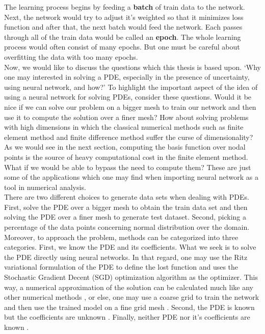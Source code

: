 The learning process begins by feeding a \textbf{batch} of train data to the network. Next, the network would try to adjust it's weighted so that it minimizes loss function and after that, the next batch would feed the network. Each passes through all of the train data would be called an \textbf{epoch}. The whole learning process would often consist of many epochs. But one must be careful about overfitting the data with too many epochs.\\
Now, we would like to discuss the questions which this thesis is based upon. `Why one may interested in solving a PDE, especially in the presence of uncertainty, using neural network, and how?' To highlight the important aspect of the idea of using a neural network for solving PDEs, consider these questions. Would it be nice if we can solve our problem on a bigger mesh to train our network and then use it to compute the solution over a finer mesh? How about solving problems with high dimensions in which the classical numerical methods such as finite element method and finite difference method suffer the curse of dimensionality? As we would see in the next section, computing the basis function over nodal points is the source of heavy computational cost in the finite element method. What if we would be able to bypass the need to compute them? These are just some of the applications which one may find when importing neural network as a tool in numerical analysis.\\
There are two different choices to generate data sets when dealing with PDEs. First, solve the PDE over a bigger mesh to obtain the train data set and then solving the PDE over a finer mesh to generate test dataset. Second, picking a percentage of the data points concerning normal distribution over the domain. Moreover, to approach the problem, methods can be categorized into three categories. First, we know the PDE and its coefficients. What we seek is to solve the PDE directly using neural networks. In that regard, one may use the Ritz variational formulation of the PDE to define the lost function and uses the Stochastic Gradient Decent (SGD) optimization algorithm as the optimizer. This way, a numerical approximation of the solution can be calculated much like any other numerical methods \cite{weinan2018deep}, or else, one may use a coarse grid to train the network and then use the trained model on a fine grid mesh \cite{wang2019prediction}. Second, the PDE is known but the coefficients are unknown \cite{raissi2017physics, Base_paper}. Finally, neither PDE nor it's coefficients are known \cite{raissi2018deep}. \\
